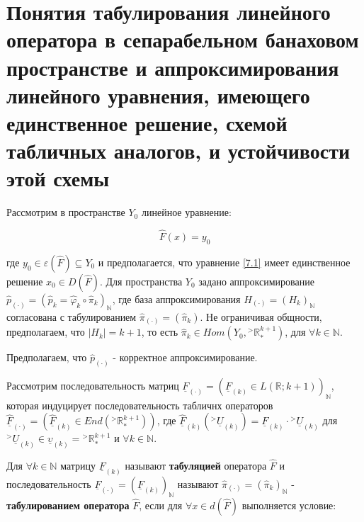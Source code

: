 \documentclass[__main__.tex]{subfiles}
\begin{document}
\section{Понятия табулирования линейного оператора в сепарабельном банаховом пространстве и аппроксимирования линейного уравнения, имеющего единственное решение, схемой табличных аналогов, и устойчивости этой схемы}

Рассмотрим в пространстве $Y_0$ линейное уравнение: 

\begin{equation}\label{7.1}
\hat{F} \left(x\right) = y_0
\end{equation}

где $y_0 \in \varepsilon \left(\hat{F}\right) \subseteq Y_0$ и предполагается, что уравнение \ref{7.1} имеет единственное решение $x_0 \in D\left(\hat{F}\right)$. Для пространства $Y_0$ задано аппроксимирование $\hat{p}_{\left(\cdot\right)} = \left(\hat{p}_k = \hat{\varphi}_k \circ \hat{\pi}_k\right)_{\mathbb{N}}$, где база аппроксимирования $H_{\left(\cdot\right)} = \left(H_k\right)_{\mathbb{N}}$ согласована с табулированием $\hat{\pi}_{\left(\cdot\right)} = \left(\hat{\pi}_k\right)$. Не ограничивая общности, предполагаем, что $\left|H_k\right| = k+1$, то есть $\hat{\pi}_k \in Hom \left(Y_0, {}^> \mathbb{R}^{k+1}_*\right)$, для $\forall k\in\mathbb{N}$.

Предполагаем, что $\hat{p}_{\left(\cdot\right)}$ - корректное аппроксимирование.

Рассмотрим последовательность матриц $\underline{F}_{\left(\cdot\right)} = \left(\underline{F}_{\left(k\right)} \in L \left(\mathbb{R};k+1\right)\right)_{\mathbb{N}}$, которая индуцирует последовательность табличнх операторов $\hat{\underline{F}}_{\left(\cdot\right)} = \left(\hat{\underline{F}}_{\left(k\right)} \in End\left({}^> \mathbb{R}^{k+1}_*\right)\right)$, где $\hat{\underline{F}}_{\left(k\right)} \left({}^> \underline{U}_{\left(k\right)}\right) = \underline{F}_{\left(k\right)} \cdot {}^> \underline{U}_{\left(k\right)}$ для ${}^> \underline{U}_{\left(k\right)} \in \underline{\upsilon}_{\left(k\right)}= {}^> \mathbb{R}^{k+1}_*$ и $\forall k \in \mathbb{N}$.

Для $\forall k \in \mathbb{N}$ матрицу $\underline{F}_{\left(k\right)}$ называют \textbf{табуляцией} оператора $\hat{F}$ и последовательность $\underline{F}_{\left(\cdot\right)} = \left(\underline{F}_{\left(k\right)}\right)_{\mathbb{N}}$ называют $\hat{\pi}_{\left(\cdot\right)} = \left(\hat{\pi}_k\right)_{\mathbb{N}}$ - \textbf{табулированием оператора} $\hat{F}$, если для $\forall x \in d \left(\hat{F}\right)$ выполняется условие:
\end{document}
